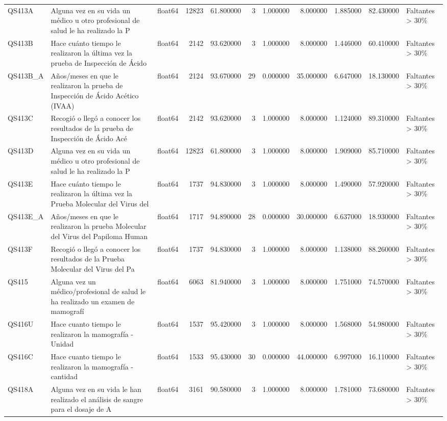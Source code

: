 \begin{longtable}{lllrrrrrrrl}
QS413A & Alguna vez en su vida un médico u otro profesional de salud le ha realizado la P & float64 & 12823 & 61.800000 & 3 & 1.000000 & 8.000000 & 1.885000 & 82.430000 & Faltantes > 30\% \\
QS413B & Hace cuánto tiempo le realizaron la última vez la prueba de Inspección de Ácido  & float64 & 2142 & 93.620000 & 3 & 1.000000 & 8.000000 & 1.446000 & 60.410000 & Faltantes > 30\% \\
QS413B\_A & Años/meses en que le realizaron la prueba de Inspección de Ácido Acético (IVAA) & float64 & 2124 & 93.670000 & 29 & 0.000000 & 35.000000 & 6.647000 & 18.130000 & Faltantes > 30\% \\
QS413C & Recogió o llegó a conocer los resultados de la prueba de Inspección de Ácido Acé & float64 & 2142 & 93.620000 & 3 & 1.000000 & 8.000000 & 1.124000 & 89.310000 & Faltantes > 30\% \\
QS413D & Alguna vez en su vida un médico u otro profesional de salud le ha realizado la P & float64 & 12823 & 61.800000 & 3 & 1.000000 & 8.000000 & 1.909000 & 85.710000 & Faltantes > 30\% \\
QS413E & Hace cuánto tiempo le realizaron la última vez la Prueba Molecular del Virus del & float64 & 1737 & 94.830000 & 3 & 1.000000 & 8.000000 & 1.490000 & 57.920000 & Faltantes > 30\% \\
QS413E\_A & Años/meses en que le realizaron la prueba Molecular del Virus del Papiloma Human & float64 & 1717 & 94.890000 & 28 & 0.000000 & 30.000000 & 6.637000 & 18.930000 & Faltantes > 30\% \\
QS413F & Recogió o llegó a conocer los resultados de la Prueba Molecular del Virus del Pa & float64 & 1737 & 94.830000 & 3 & 1.000000 & 8.000000 & 1.138000 & 88.260000 & Faltantes > 30\% \\
QS415 & Alguna vez un médico/profesional de salud le ha realizado un examen de mamografí & float64 & 6063 & 81.940000 & 3 & 1.000000 & 8.000000 & 1.751000 & 74.570000 & Faltantes > 30\% \\
QS416U & Hace cuanto tiempo le realizaron la mamografía - Unidad & float64 & 1537 & 95.420000 & 3 & 1.000000 & 8.000000 & 1.568000 & 54.980000 & Faltantes > 30\% \\
QS416C & Hace cuanto tiempo le realizaron la mamografía - cantidad & float64 & 1533 & 95.430000 & 30 & 0.000000 & 44.000000 & 6.997000 & 16.110000 & Faltantes > 30\% \\
QS418A & Alguna vez en su vida le han realizado el análisis de sangre para el dosaje de A & float64 & 3161 & 90.580000 & 3 & 1.000000 & 8.000000 & 1.781000 & 73.680000 & Faltantes > 30\% \\

\end{longtable}
